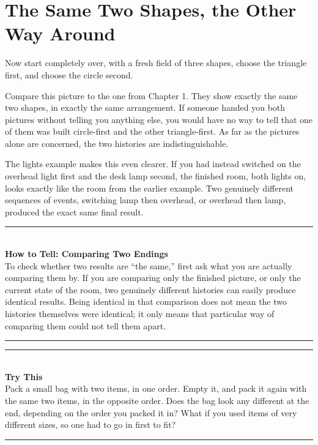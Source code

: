 \documentclass[11pt]{book}
\newenvironment{algorithmproc}[1]{%
\vspace{0.6em}\noindent\rule{\linewidth}{0.6pt}\\[0.2em]\textbf{How to Tell: #1}\\[0.3em]}%
{\\[0.2em]\noindent\rule{\linewidth}{0.6pt}\vspace{0.6em}}
\newenvironment{trythis}{%
\vspace{0.6em}\noindent\rule{\linewidth}{0.6pt}\\[0.2em]\textbf{Try This}\\[0.3em]}%
{\\[0.2em]\noindent\rule{\linewidth}{0.6pt}\vspace{0.6em}}
\begin{document}
\section{The Same Two Shapes, the Other Way Around}

Now start completely over, with a fresh field of three shapes, choose the triangle first, and choose the circle second.

\begin{center}
\end{center}

Compare this picture to the one from Chapter 1. They show exactly the same two shapes, in exactly the same arrangement. If someone handed you both pictures without telling you anything else, you would have no way to tell that one of them was built circle-first and the other triangle-first. As far as the pictures alone are concerned, the two histories are indistinguishable.

The lights example makes this even clearer. If you had instead switched on the overhead light first and the desk lamp second, the finished room, both lights on, looks exactly like the room from the earlier example. Two genuinely different sequences of events, switching lamp then overhead, or overhead then lamp, produced the exact same final result.

\begin{algorithmproc}{Comparing Two Endings}
To check whether two results are ``the same,'' first ask what you are actually comparing them by. If you are comparing only the finished picture, or only the current state of the room, two genuinely different histories can easily produce identical results. Being identical in that comparison does not mean the two histories themselves were identical; it only means that particular way of comparing them could not tell them apart.
\end{algorithmproc}

\begin{trythis}
Pack a small bag with two items, in one order. Empty it, and pack it again with the same two items, in the opposite order. Does the bag look any different at the end, depending on the order you packed it in? What if you used items of very different sizes, so one had to go in first to fit?
\end{trythis}
\end{document}

